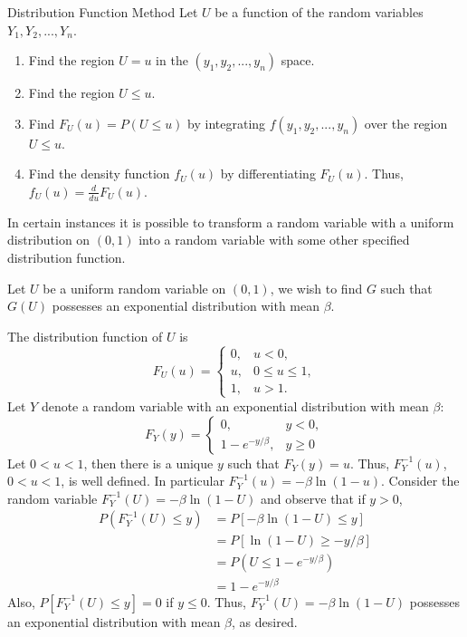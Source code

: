 \documentclass[12pt, a4paper, twoside, openright, titlepage]{book}
\begin{document}
\begin{defn}{Distribution Function Method}{}
    Let $U$ be a function of the random variables $Y_1,Y_2,...,Y_n$. \begin{enumerate}
        \item Find the region $U = u$ in the $(y_1,y_2,...,y_n)$ space.
        \item Find the region $U \leq u$.
        \item Find $F_U(u) = P(U\leq u)$ by integrating $f(y_1,y_2,...,y_n)$ over the region $U \leq u$.
        \item Find the density function $f_U(u)$ by differentiating $F_U(u)$. Thus, $f_U(u) = \frac{d}{du}F_U(u)$.
    \end{enumerate}
\end{defn}

In certain instances it is possible to transform a random variable with a uniform distribution on $(0,1)$ into a random variable with some other specified distribution function.

\begin{eg}{}{}
    Let $U$ be a uniform random variable on $(0,1)$, we wish to find $G$ such that $G(U)$ possesses an exponential distribution with mean $\beta$.
    
    The distribution function of $U$ is \begin{equation*}
        F_U(u) = \left\{\begin{array}{ll} 0, & u < 0, \\ u, & 0 \leq u \leq 1, \\ 1, & u > 1. \end{array}\right.
    \end{equation*}
    Let $Y$ denote a random variable with an exponential distribution with mean $\beta$: \begin{equation*}
        F_Y(y) = \left\{\begin{array}{lc} 0, & y < 0, \\ 1 - e^{-y/\beta}, & y \geq 0 \end{array}\right.
    \end{equation*}
    Let $0 < u < 1$, then there is a unique $y$ such that $F_Y(y) = u$. Thus, $F^{-1}_Y(u)$, $0 < u < 1$, is well defined. In particular $F_Y^{-1}(u) = -\beta\ln(1-u)$. Consider the random variable $F^{-1}_Y(U) = -\beta\ln(1-U)$ and observe that if $y > 0$, \begin{align*}
        P(F^{-1}_Y(U) \leq y) &= P[-\beta\ln(1-U)\leq y] \\
        &= P[\ln(1-U)\geq -y/\beta] \\
        &= P(U \leq 1 - e^{-y/\beta}) \\
        &= 1 - e^{-y/\beta}
    \end{align*}
    Also, $P[F^{-1}_Y(U) \leq y] = 0$ if $y \leq 0$. Thus, $F^{-1}_Y(U) = -\beta\ln(1-U)$ possesses an exponential distribution with mean $\beta$, as desired.
\end{eg}
\end{document}
